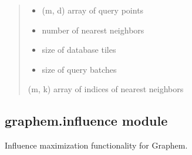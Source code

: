 \documentclass[letterpaper,10pt,english]{sphinxmanual}
\begin{document}
\begin{fulllineitems}
\begin{fulllineitems}
\begin{quote}
\begin{description}
\begin{itemize}
\item {} 
\sphinxAtStartPar
{} \textendash{} (m, d) array of query points

\item {} 
\sphinxAtStartPar
{} \textendash{} number of nearest neighbors

\item {} 
\sphinxAtStartPar
{} \textendash{} size of database tiles

\item {} 
\sphinxAtStartPar
{} \textendash{} size of query batches

\end{itemize}

\sphinxAtStartPar
(m, k) array of indices of nearest neighbors

\end{description}\end{quote}

\end{fulllineitems}


\end{fulllineitems}



\subsection{graphem.influence module}
\label{\detokenize{graphem:module-graphem.influence}}\label{\detokenize{graphem:graphem-influence-module}}
\sphinxAtStartPar
Influence maximization functionality for Graphem.
\end{document}
